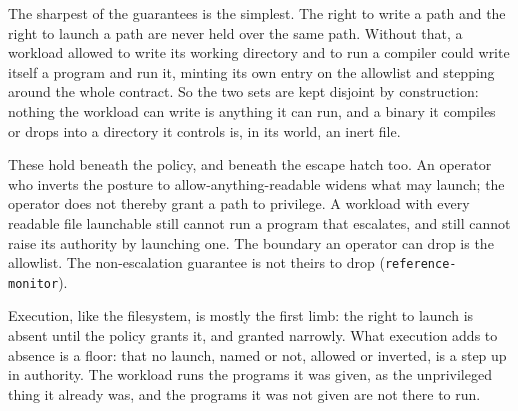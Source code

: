 The sharpest of the guarantees is the simplest. The right to write a
path and the right to launch a path are never held over the same path.
Without that, a workload allowed to write its working directory and to
run a compiler could write itself a program and run it, minting its own
entry on the allowlist and stepping around the whole contract. So the
two sets are kept disjoint by construction: nothing the workload can
write is anything it can run, and a binary it compiles or drops into a
directory it controls is, in its world, an inert file.

These hold beneath the policy, and beneath the escape hatch too. An
operator who inverts the posture to allow-anything-readable widens what
may launch; the operator does not thereby grant a path to privilege. A
workload with every readable file launchable still cannot run a program
that escalates, and still cannot raise its authority by launching one.
The boundary an operator can drop is the allowlist. The non-escalation
guarantee is not theirs to drop (\texttt{reference-monitor}).

Execution, like the filesystem, is mostly the first limb: the right to
launch is absent until the policy grants it, and granted narrowly. What
execution adds to absence is a floor: that no launch, named or not,
allowed or inverted, is a step up in authority. The workload runs the
programs it was given, as the unprivileged thing it already was, and the
programs it was not given are not there to run.
